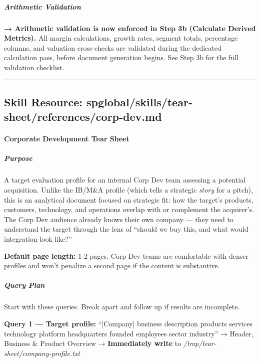 \documentclass[11pt]{article}
\begin{document}
\subparagraph{Arithmetic Validation}\mbox{}\par

\textbf{→ Arithmetic validation is now enforced in Step 3b (Calculate Derived Metrics).} All margin calculations, growth rates, segment totals, percentage columns, and valuation cross-checks are validated during the dedicated calculation pass, before document generation begins. See Step 3b for the full validation checklist.


\vspace{0.8em}\hrule\vspace{0.8em}

\subsection{Skill Resource: spglobal/skills/tear-sheet/references/corp-dev.md}\label{file:spglobal-skills-tear-sheet-references-corp-dev.md}

\paragraph{Corporate Development Tear Sheet}\mbox{}\par

\subparagraph{Purpose}\mbox{}\par
A target evaluation profile for an internal Corp Dev team assessing a potential acquisition. Unlike the IB/M\&A profile (which tells a strategic \emph{story} for a pitch), this is an analytical document focused on strategic fit: how the target's products, customers, technology, and operations overlap with or complement the acquirer's. The Corp Dev audience already knows their own company — they need to understand the target through the lens of ``should we buy this, and what would integration look like?''


\textbf{Default page length:} 1-2 pages. Corp Dev teams are comfortable with denser profiles and won't penalize a second page if the content is substantive.


\subparagraph{Query Plan}\mbox{}\par

Start with these queries. Break apart and follow up if results are incomplete.


\textbf{Query 1 — Target profile:} ``[Company] business description products services technology platform headquarters founded employees sector industry'' → Header, Business \& Product Overview → \textbf{Immediately write} to \emph{/tmp/tear-sheet/company-profile.txt}
\end{document}
